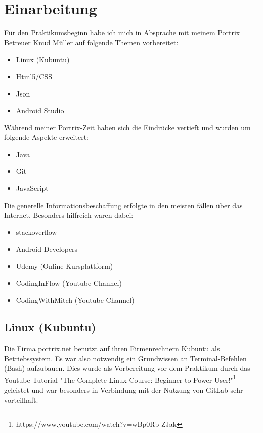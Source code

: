 \newpage
\chapter{Einarbeitung}
F\"ur den Praktikumsbeginn habe ich mich in Absprache mit meinem Portrix Betreuer Knud M\"uller auf folgende Themen vorbereitet:
\begin{itemize}
\item Linux (Kubuntu)
\item Html5/CSS
\item Json
\item Android Studio
\end{itemize}

W\"ahrend meiner Portrix-Zeit haben sich die Eindr\"ucke vertieft und wurden um folgende Aspekte erweitert:

\begin{itemize}
\item Java
\item Git
\item JavaScript
\end{itemize}

Die generelle Informationsbeschaffung erfolgte in den meisten f\"allen \"uber das Internet. Besonders hilfreich waren dabei:

\begin{itemize}
\item stackoverflow
\item Android Developers
\item Udemy (Online Kursplattform)
\item CodingInFlow (Youtube Channel)
\item CodingWithMitch (Youtube Channel)
\end{itemize}

\section{Linux (Kubuntu)}
Die Firma portrix.net benutzt auf ihren Firmenrechnern Kubuntu als Betriebssystem. Es war also notwendig ein Grundwissen an Terminal-Befehlen (Bash) aufzubauen. Dies wurde als Vorbereitung vor dem Praktikum durch das Youtube-Tutorial "The Complete Linux Course: Beginner to Power User!"\footnote{https://www.youtube.com/watch?v=wBp0Rb-ZJak}  geleistet und war besonders in Verbindung mit der Nutzung von GitLab sehr vorteilhaft. 

